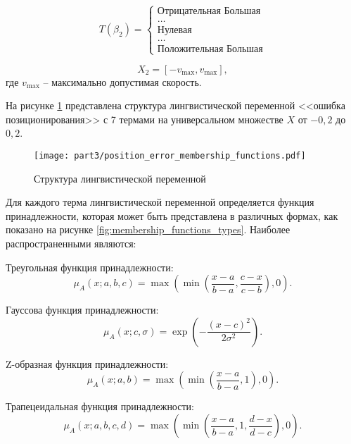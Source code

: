 \begin{equation*}
	T(\beta_2) =\begin{cases}
		\text{Отрицательная Большая} \\
		\ldots                       \\
		\text{Нулевая}               \\
		\ldots                       \\
		\text{Положительная Большая}
	\end{cases}
\end{equation*}

\begin{equation*}
	X_2 = [-v_{\text{max}}, v_{\text{max}}],
\end{equation*}
где $v_{\text{max}}$ -- максимально допустимая скорость.

На рисунке \ref{fig:linguistic_variable_structure} представлена структура лингвистической переменной
<<ошибка позиционирования>> с
7 термами на универсальном множестве $X$ от $-0,2$ до $0,2$.

\begin{figure}[ht]
	\centering
	\texttt{[image: part3/position\_error\_membership\_functions.pdf]}
	\caption{Структура лингвистической переменной}
	\label{fig:linguistic_variable_structure}
\end{figure}

Для каждого терма лингвистической переменной определяется функция принадлежности,
которая может быть представлена в различных формах,
как показано на рисунке \ref{fig:membership_functions_types}.
Наиболее распространенными являются:

Треугольная функция принадлежности:
\begin{equation*}
	\mu_A(x; a, b, c) = \max\left(\min\left(\frac{x-a}{b-a}, \frac{c-x}{c-b}\right), 0\right).
\end{equation*}

Гауссова функция принадлежности:
\begin{equation}\label{eq:gaussian_membership}
	\mu_A(x; c, \sigma) = \exp\left(-\frac{(x-c)^2}{2\sigma^2}\right).
\end{equation}

Z-образная функция принадлежности:
\begin{equation}\label{eq:z_membership}
	\mu_A(x; a, b) = \max\left(\min\left(\frac{x-a}{b-a}, 1\right), 0\right).
\end{equation}

Трапецеидальная функция принадлежности:
\begin{equation*}
	\mu_A(x; a, b, c, d) = \max\left(\min\left(\frac{x-a}{b-a}, 1, \frac{d-x}{d-c}\right), 0\right).
\end{equation*}

